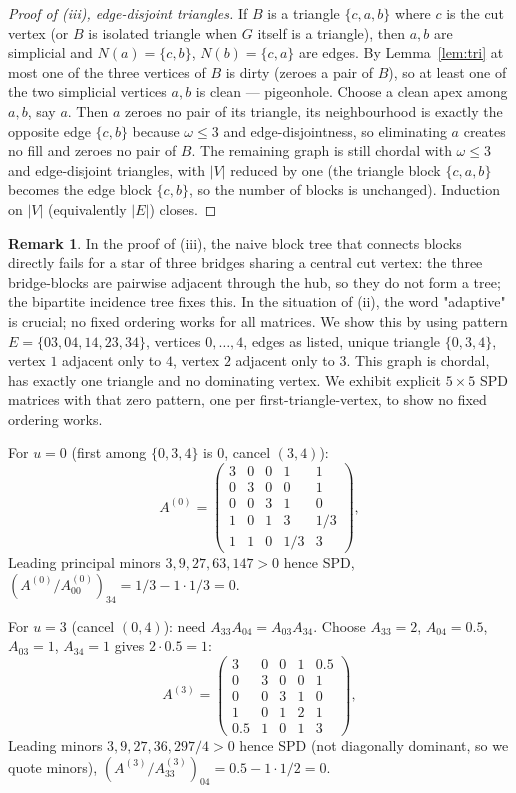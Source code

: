 \documentclass[11pt]{article}
\theoremstyle{plain}
\theoremstyle{definition}
\newtheorem{remark}[theorem]{Remark}
\begin{document}
\begin{aiblock}
\begin{proof}[Proof of (iii), edge-disjoint triangles]
If $B$ is a triangle $\{c,a,b\}$ where $c$ is the cut vertex (or $B$ is isolated triangle when $G$ itself is a triangle), then $a,b$ are simplicial and $N(a)=\{c,b\}$, $N(b)=\{c,a\}$ are edges. By Lemma~\ref{lem:tri} at most one of the three vertices of $B$ is dirty (zeroes a pair of $B$), so at least one of the two simplicial vertices $a,b$ is clean — pigeonhole. Choose a clean apex among $a,b$, say $a$. Then $a$ zeroes no pair of its triangle, its neighbourhood is exactly the opposite edge $\{c,b\}$ because $\omega\le3$ and edge-disjointness, so eliminating $a$ creates no fill and zeroes no pair of $B$. The remaining graph is still chordal with $\omega\le3$ and edge-disjoint triangles, with $|V|$ reduced by one (the triangle block $\{c,a,b\}$ becomes the edge block $\{c,b\}$, so the number of blocks is unchanged). Induction on $|V|$ (equivalently $|E|$) closes.
\end{proof}
\begin{remark}
    In the proof of (iii), the naive block tree that connects blocks directly fails for a star of three bridges sharing a central cut vertex: the three bridge-blocks are pairwise adjacent through the hub, so they do not form a tree; the bipartite incidence tree fixes this. In the situation of (ii), the word "adaptive" is crucial; no fixed ordering works for all matrices. We show this by using pattern $E=\{03,04,14,23,34\}$, vertices $0,\dots,4$, edges as listed, unique triangle $\{0,3,4\}$, vertex $1$ adjacent only to $4$, vertex $2$ adjacent only to $3$. This graph is chordal, has exactly one triangle and no dominating vertex. We exhibit explicit $5\times5$ SPD matrices with that zero pattern, one per first-triangle-vertex, to show no fixed ordering works.

For $u=0$ (first among $\{0,3,4\}$ is $0$, cancel $(3,4)$):
\[
A^{(0)}=\begin{pmatrix}
3&0&0&1&1\\
0&3&0&0&1\\
0&0&3&1&0\\
1&0&1&3&1/3\\
1&1&0&1/3&3
\end{pmatrix},
\]
Leading principal minors $3,9,27,63,147>0$ hence SPD, $(A^{(0)}/A^{(0)}_{00})_{34}=1/3-1\cdot1/3=0$.

For $u=3$ (cancel $(0,4)$): need $A_{33}A_{04}=A_{03}A_{34}$. Choose $A_{33}=2$, $A_{04}=0.5$, $A_{03}=1$, $A_{34}=1$ gives $2\cdot0.5=1$:
\[
A^{(3)}=\begin{pmatrix}
3&0&0&1&0.5\\
0&3&0&0&1\\
0&0&3&1&0\\
1&0&1&2&1\\
0.5&1&0&1&3
\end{pmatrix},
\]
Leading minors $3,9,27,36,297/4>0$ hence SPD (not diagonally dominant, so we quote minors), $(A^{(3)}/A^{(3)}_{33})_{04}=0.5-1\cdot1/2=0$.


\end{remark}
\end{aiblock}
\end{document}
